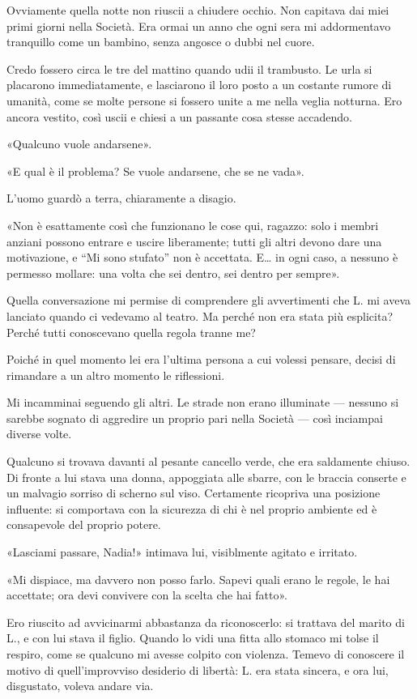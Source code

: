 Ovviamente quella notte non riuscii a chiudere occhio. Non capitava dai miei primi giorni nella
Società. Era ormai un anno che ogni sera mi addormentavo tranquillo come un bambino, senza angosce o
dubbi nel cuore.

Credo fossero circa le tre del mattino quando udii il trambusto. Le urla si placarono
immediatamente, e lasciarono il loro posto a un costante rumore di umanità, come se molte persone si
fossero unite a me nella veglia notturna. Ero ancora vestito, così uscii e chiesi a un passante cosa
stesse accadendo.

«Qualcuno vuole andarsene».

«E qual è il problema? Se vuole andarsene, che se ne vada».

L'uomo guardò a terra, chiaramente a disagio.

«Non è esattamente così che funzionano le cose qui, ragazzo: solo i membri anziani possono entrare e
uscire liberamente; tutti gli altri devono dare una motivazione, e ``Mi sono stufato'' non è
accettata. E\dots{} in ogni caso, a nessuno è permesso mollare: una volta che sei dentro, sei dentro
per sempre».

Quella conversazione mi permise di comprendere gli avvertimenti che L. mi aveva lanciato quando ci
vedevamo al teatro. Ma perché non era stata più esplicita? Perché tutti conoscevano quella regola
tranne me?

Poiché in quel momento lei era l'ultima persona a cui volessi pensare, decisi di rimandare a un
altro momento le riflessioni.

Mi incamminai seguendo gli altri. Le strade non erano illuminate --- nessuno si sarebbe sognato di
aggredire un proprio pari nella Società --- così inciampai diverse volte.

Qualcuno si trovava davanti al pesante cancello verde, che era saldamente chiuso. Di fronte a lui
stava una donna, appoggiata alle sbarre, con le braccia conserte e un malvagio sorriso di scherno
sul viso. Certamente ricopriva una posizione influente: si comportava con la sicurezza di chi è nel
proprio ambiente ed è consapevole del proprio potere.

«Lasciami passare, Nadia!» intimava lui, visiblmente agitato e irritato.

«Mi dispiace, ma davvero non posso farlo. Sapevi quali erano le regole, le hai accettate; ora devi
convivere con la scelta che hai fatto».

Ero riuscito ad avvicinarmi abbastanza da riconoscerlo: si trattava del marito di L., e con lui
stava il figlio. Quando lo vidi una fitta allo stomaco mi tolse il respiro, come se qualcuno mi
avesse colpito con violenza. Temevo di conoscere il motivo di quell'improvviso desiderio di libertà:
L. era stata sincera, e ora lui, disgustato, voleva andare via.

